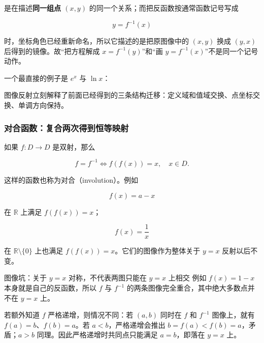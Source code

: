 \documentclass[11pt,a4paper]{ctexart}
\newcounter{none}
\begin{document}
是在描述\textbf{同一组点 \((x,y)\)} 的同一个关系；而把反函数按通常函数记号写成

\[
y=f^{-1}(x)
\]

时，坐标角色已经重新命名，所以它描述的是把原图像中的 \((x,y)\) 换成 \((y,x)\) 后得到的镜像。故“把方程解成 \(x=f^{-1}(y)\)”和“画 \(y=f^{-1}(x)\)”不是同一个记号动作。

一个最直接的例子是 \(e^x\) 与 \(\ln x\)：

\begin{center}
\end{center}

图像反射立刻解释了前面已经得到的三条结构迁移：定义域和值域交换、点坐标交换、单调方向保持。

\subsubsection{对合函数：复合两次得到恒等映射}

如果 \(f:D\to D\) 是双射，那么

\[
\boxed{
f=f^{-1}
\Longleftrightarrow
f(f(x))=x,\quad x\in D.
}
\]

这样的函数也称为对合（involution）。例如

\[
f(x)=a-x
\]

在 \(\mathbb R\) 上满足 \(f(f(x))=x\)；

\[
f(x)=\frac1x
\]

在 \(\mathbb R\setminus\{0\}\) 上也满足 \(f(f(x))=x\)。它们的图像作为整体关于 \(y=x\) 反射以后不变。

\begin{warnbox}{图像坑：关于 \(y=x\) 对称，不代表两图只能在 \(y=x\) 上相交}
例如 \(f(x)=1-x\) 本身就是自己的反函数，所以 \(f\) 与 \(f^{-1}\) 的两条图像完全重合，其中绝大多数点并不在 \(y=x\) 上。

若额外知道 \(f\) 严格递增，则情况不同：若 \((a,b)\) 同时在 \(f\) 和 \(f^{-1}\) 图像上，就有 \(f(a)=b\)、\(f(b)=a\)。若 \(a<b\)，严格递增会推出 \(b=f(a)<f(b)=a\)，矛盾；\(a>b\) 同理。因此严格递增时共同点只能满足 \(a=b\)，即落在 \(y=x\) 上。
\end{warnbox}
\end{document}
